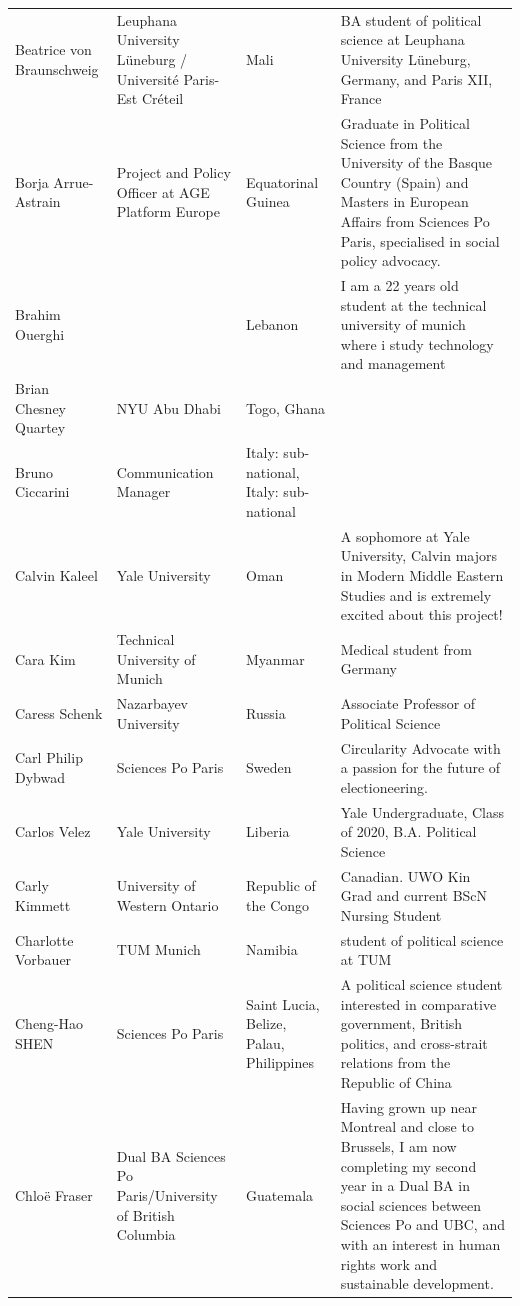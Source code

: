 \documentclass[]{article}
\begin{document}
\begin{longtable}{l>{\raggedright\arraybackslash}p{2cm}>{\raggedright\arraybackslash}p{2cm}>{\raggedright\arraybackslash}p{3cm}}
\addlinespace
Beatrice von Braunschweig & Leuphana University Lüneburg / Université Paris-Est Créteil & Mali & BA student of political science at Leuphana University Lüneburg, Germany, and Paris XII, France\\
\rowcolor{gray!6}  Borja Arrue-Astrain & Project and Policy Officer at AGE Platform Europe & Equatorinal Guinea & Graduate in Political Science from the University of the Basque Country (Spain) and Masters in European Affairs from Sciences Po Paris, specialised in social policy advocacy.\\
Brahim Ouerghi &  & Lebanon & I am a 22 years old student at the technical university of munich where i study technology and management\\
\rowcolor{gray!6}  Brian Chesney Quartey & NYU Abu Dhabi & Togo, Ghana & \\
Bruno Ciccarini & Communication Manager & Italy: sub-national, Italy: sub-national & \\
\addlinespace
\rowcolor{gray!6}  Calvin Kaleel & Yale University & Oman & A sophomore at Yale University, Calvin majors in Modern Middle Eastern Studies and is extremely excited about this project!\\
Cara Kim & Technical University of Munich & Myanmar & Medical student from Germany\\
\rowcolor{gray!6}  Caress Schenk & Nazarbayev University & Russia & Associate Professor of Political Science\\
Carl Philip Dybwad & Sciences Po Paris & Sweden & Circularity Advocate with a passion for the future of electioneering.\\
\rowcolor{gray!6}  Carlos Velez & Yale University & Liberia & Yale Undergraduate, Class of 2020, B.A. Political Science\\
\addlinespace
Carly Kimmett & University of Western Ontario & Republic of the Congo & Canadian. UWO Kin Grad and current BScN Nursing Student\\
\rowcolor{gray!6}  Charlotte Vorbauer & TUM Munich & Namibia & student of political science at TUM\\
Cheng-Hao SHEN & Sciences Po Paris & Saint Lucia, Belize, Palau, Philippines & A political science student interested in comparative government, British politics, and cross-strait relations from the Republic of China\\
\rowcolor{gray!6}  Chloë Fraser & Dual BA Sciences Po Paris/University of British Columbia & Guatemala & Having grown up near Montreal and close to Brussels, I am now completing my second year in a Dual BA in social sciences between Sciences Po and UBC, and with an interest in human rights work and sustainable development.\\

\end{longtable}
\end{document}
